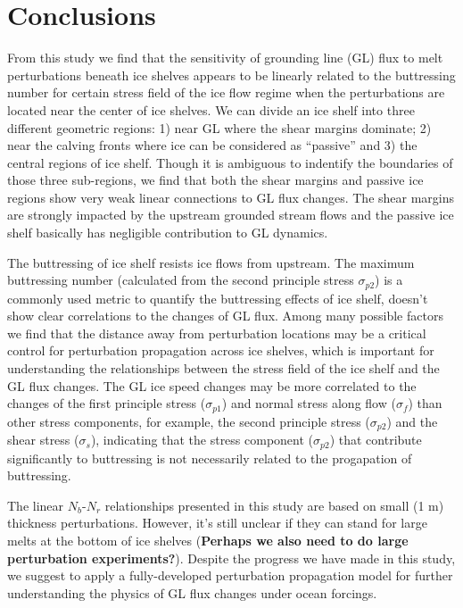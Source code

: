 \documentclass[review,oneside]{igs}
\begin{document}
\section{Conclusions}

From this study we find that the sensitivity of grounding line (GL) flux to melt perturbations beneath ice shelves appears to be linearly related to the buttressing number for certain stress field of the ice flow regime when the perturbations are located near the center of ice shelves. We can divide an ice shelf into three different geometric regions: 1) near GL where the shear margins dominate; 2) near the calving fronts where ice can be considered as ``passive'' and 3) the central regions of ice shelf. Though it is ambiguous to indentify the boundaries of those three sub-regions, we find that both the shear margins and passive ice regions show very weak linear connections to GL flux changes. The shear margins are strongly impacted by the upstream grounded stream flows and the passive ice shelf basically has negligible contribution to GL dynamics. 

The buttressing of ice shelf resists ice flows from upstream. The maximum buttressing number (calculated from the second principle stress $\sigma_{p2}$) is a commonly used metric to quantify the buttressing effects of ice shelf, doesn't show clear correlations to the changes of GL flux. Among many possible factors we find that the distance away from perturbation locations may be a critical control for perturbation propagation across ice shelves, which is important for understanding the relationships between the stress field of the ice shelf and the GL flux changes. The GL ice speed changes may be more correlated to the changes of the first principle stress ($\sigma_{p1}$) and normal stress along flow ($\sigma_{f}$) than other stress components, for example, the second principle stress ($\sigma_{p2}$) and the shear stress ($\sigma_s$), indicating that the stress component ($\sigma_{p2}$) that contribute significantly to buttressing is not necessarily related to the progapation of buttressing. 

The linear $N_b$-$N_r$ relationships presented in this study are based on small (1 m) thickness perturbations. However, it's still unclear if they can stand for large melts at the bottom of ice shelves ({\bf{Perhaps we also need to do large perturbation experiments?}}). Despite the progress we have made in this study, we suggest to apply a fully-developed perturbation propagation model for further understanding the physics of GL flux changes under ocean forcings. 
\end{document}

